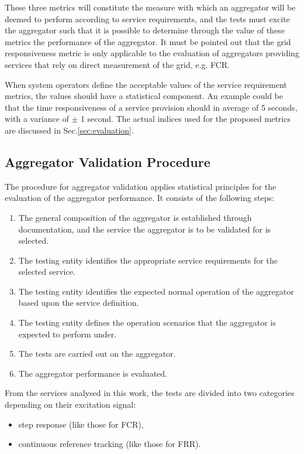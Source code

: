 These three metrics will constitute the measure with which an aggregator will be deemed to perform according to service requirements, and the tests must excite the aggregator such that it is possible to determine through the value of these metrics the performance of the aggregator. It must be pointed out that the grid responsiveness metric is only applicable to the evaluation of aggregators providing services that rely on direct measurement of the grid, e.g. FCR.

When system operators define the acceptable values of the service requirement metrics, the values should have a statistical component. An example could be that the time responsiveness of a service provision should in average of 5 seconds, with a variance of $\pm$ 1 second. The actual indices used for the proposed metrics are discussed in Sec.\ref{sec:evaluation}.

\subsection{Aggregator Validation Procedure}\label{sec:alignment}
The procedure for aggregator validation applies statistical principles for the evaluation of the aggregator performance. It consists of the following steps:
\begin{enumerate}
	\item The general composition of the aggregator is established through documentation, and the service the aggregator is to be validated for is selected. %
	\item The testing entity identifies the appropriate service requirements for the selected service.
	\item The testing entity identifies the expected normal operation of the aggregator based upon the service definition.
	\item The testing entity defines the operation scenarios that the aggregator is expected to perform under. %
	\item The tests are carried out on the aggregator.
	\item The aggregator performance is evaluated.
\end{enumerate}

From the services analysed in this work, the tests are divided into two categories depending on their excitation signal:
\begin{itemize}
\item step response (like those for FCR),
\item continuous reference tracking (like those for FRR).
\end{itemize}

